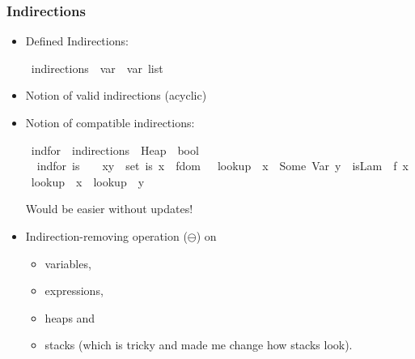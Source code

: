 \documentclass{beamer}
\begin{document}
\begin{frame}
\frametitle{Indirections}
\begin{itemize}
\item Defined Indirections:
\begin{isabelle}
\isamarkupfalse%
\ indirections\ {\isacharequal}\ {\isachardoublequoteopen}{\isacharparenleft}var\ {\isasymtimes}\ var{\isacharparenright}\ list{\isachardoublequoteclose}
\end{isabelle}
\item Notion of valid indirections (acyclic)
\item Notion of compatible indirections:
\begin{isabelle}
\isamarkupfalse%
\ ind{\isacharunderscore}for\ {\isacharcolon}{\isacharcolon}\ {\isachardoublequoteopen}indirections\ {\isasymRightarrow}\ Heap\ {\isasymRightarrow}\ bool{\isachardoublequoteclose}\ \isanewline
\ \ {\isachardoublequoteopen}ind{\isacharunderscore}for\ is\ {\isasymGamma}\ {\isacharequal}\ {\isacharparenleft}{\isasymforall}\ {\isacharparenleft}x{\isacharcomma}y{\isacharparenright}\ {\isasymin}\ set\ is{\isachardot}\ {\isacharparenleft}x\ {\isasymin}\ fdom\ {\isasymGamma}\ {\isasymand}\ {\isacharparenleft}{\isacharparenleft}{\isacharparenleft}lookup\ {\isasymGamma}\ x{\isacharparenright}\ {\isacharequal}\ Some\ {\isacharparenleft}Var\ y{\isacharparenright}\ {\isasymor}\ {\isacharparenleft}isLam\ {\isacharparenleft}{\isasymGamma}\ f{\isacharbang}\ x{\isacharparenright}{\isacharparenright}\ {\isasymand}\ lookup\ {\isasymGamma}\ x\ {\isacharequal}\ lookup\ {\isasymGamma}\ y{\isacharparenright}{\isacharparenright}{\isacharparenright}{\isacharparenright}{\isachardoublequoteclose}
\end{isabelle}
Would be easier without updates!
\item Indirection-removing operation ($\ominus$) on
\begin{itemize}
\item variables,
\item expressions,
\item heaps and
\item stacks (which is tricky and made me change how stacks look).
\end{itemize}
\end{itemize}
\end{frame}
\end{document}
